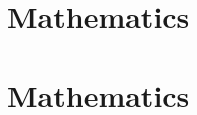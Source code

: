 \documentclass[11pt]{book}
\begin{document}
\dominitoc	%
\tableofcontents




\chapter*{Mathematics}





\chapter*{Mathematics}


\appendix
\end{document}
